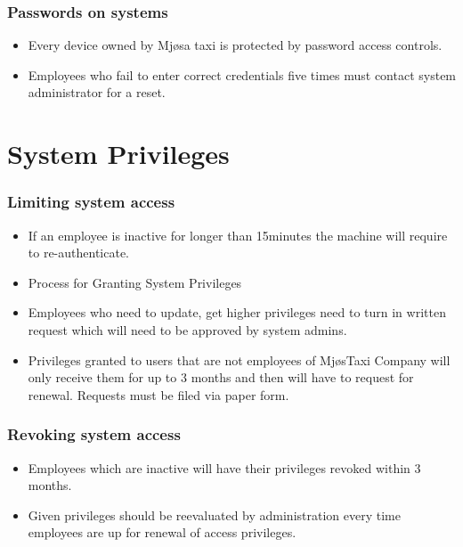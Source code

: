 \subsubsection*{Passwords on systems}
    \begin{itemize}[noitemsep]
        \item Every device owned by Mjøsa taxi is protected by password access controls.
        \item Employees who fail to enter correct credentials five times must contact system administrator for a reset.
    \end{itemize}{}
    
\section{System Privileges}
\subsubsection*{Limiting system access}
    \begin{itemize}[noitemsep]
        \item If an employee is inactive for longer than 15minutes the machine will require to re-authenticate.
        \item Process for Granting System Privileges
        \item Employees who need to update, get higher privileges need to turn in written request which will need to be approved by system admins.
        \item Privileges granted to users that are not employees of MjøsTaxi Company will only receive them for up to 3 months and then will have to request for renewal. Requests must be filed via paper form.
    \end{itemize}

\subsubsection*{Revoking system access}
    \begin{itemize}[noitemsep]
        \item Employees which are inactive will have their privileges revoked within 3 months.
        \item Given privileges should be reevaluated by administration every time employees are up for renewal of access privileges.
    \end{itemize}

